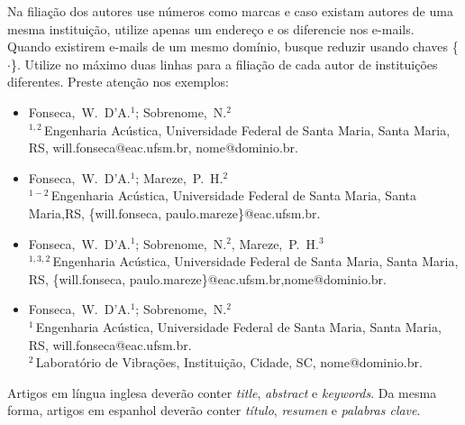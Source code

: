 \documentclass[12pt, a4paper, twoside, twocolumn]{article}
\begin{document}
Na filiação dos autores use números como marcas e caso existam autores de uma mesma instituição, utilize apenas um endereço e os diferencie nos e-mails. Quando existirem e-mails de um mesmo domínio, busque reduzir usando chaves \{$\cdot$\}. Utilize no máximo duas linhas para a filiação de cada autor de instituições diferentes. Preste atenção nos exemplos:
%
\begin{flushleft}
\vspace{-0.7\baselineskip}
\begin{itemize}[noitemsep,topsep=-1ex,align=left,leftmargin=0.2cm] \itemsep=9pt

	\item Fonseca,~W.~D'A.$^1$; Sobrenome,~N.$^2$\\[5pt]	
{\small		$^{1,2}$\,Engenharia Acústica, Universidade Federal de Santa Maria, Santa Maria, RS,\linebreak 
	 will.fonseca@eac.ufsm.br, nome@dominio.br.}
	
	\item Fonseca,~W.~D'A.$^1$; Mareze,~P.~H.$^2$\\[5pt]	
{\small	$^{1-2}$\,Engenharia Acústica, Universidade Federal de Santa Maria, Santa Maria,RS, 
	\{will.fonseca, paulo.mareze\}@eac.ufsm.br.}
	
	\item Fonseca,~W.~D'A.$^1$; Sobrenome,~N.$^2$, Mareze,~P.~H.$^3$\\[6pt]	
{\small		$^{1,3,2}$\,Engenharia Acústica, Universidade Federal de Santa Maria, Santa Maria, RS, 
	\{will.fonseca, paulo.mareze\}@eac.ufsm.br,\linebreak nome@dominio.br.}

	\item Fonseca,~W.~D'A.$^1$; Sobrenome,~N.$^2$\\[5pt]	
{\small		$^{1}$\,Engenharia Acústica, Universidade Federal de Santa Maria, Santa Maria, RS, 
	will.fonseca@eac.ufsm.br.\\[4pt]		
	$^2$\,Laboratório de Vibrações, Instituição, Cidade, SC, nome@dominio.br.}
\end{itemize}
\vspace{-0.5\baselineskip}
\end{flushleft}

Artigos em língua inglesa deverão conter \textit{title}, \textsl{abstract} e \textit{keywords}. Da mesma forma, artigos em espanhol deverão conter \textit{título}, \textit{resumen} e \textit{palabras clave}.

\end{document}
